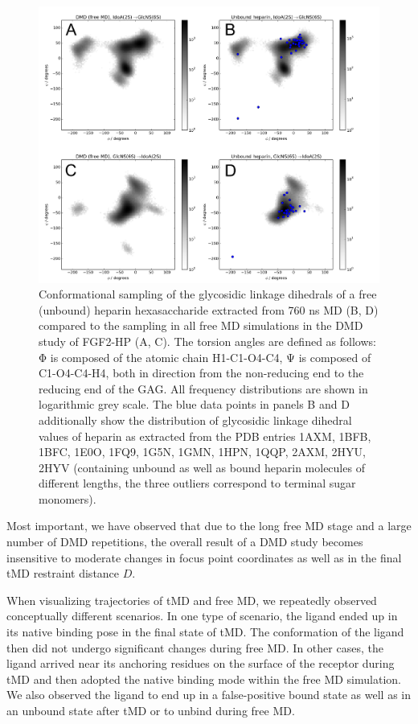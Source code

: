 \begin{figure}
\begin{adjustwidth}{-1.5cm}{-1.5cm}
\centering
\includegraphics[width=1.3\textwidth]{gfx/dmd/suppl/suppl_glyco_linkage_torsion_maps_03.png}
\caption[]{
Conformational sampling of the glycosidic linkage dihedrals of a free (unbound)
heparin hexasaccharide extracted from 760 ns MD (B, D) compared to the sampling
in all free MD simulations in the DMD study of FGF2-HP (A, C). The torsion
angles are defined as follows: Φ is composed of the atomic chain H1-C1-O4-C4, Ψ
is composed of C1-O4-C4-H4, both in direction from the non-reducing end to the
reducing end of the GAG. All frequency distributions are shown in logarithmic
grey scale. The blue data points in panels B and D additionally show the
distribution of glycosidic linkage dihedral values of heparin as extracted from
the PDB entries 1AXM, 1BFB, 1BFC, 1E0O, 1FQ9, 1G5N, 1GMN, 1HPN, 1QQP, 2AXM,
2HYU, 2HYV (containing unbound as well as bound heparin molecules of different
lengths, the three outliers correspond to terminal sugar monomers).
}
\label{fig:dmd:glycolinkage_sampling}
\end{adjustwidth}
\end{figure}


Most important, we have observed that due to the long free MD stage and a large
number of DMD repetitions, the overall result of a DMD study becomes insensitive
to moderate changes in focus point coordinates as well as in the final tMD
restraint distance $D$.

When visualizing trajectories of tMD and free MD, we repeatedly observed
conceptually different scenarios. In one type of scenario, the ligand ended up
in its native binding pose in the final state of tMD. The conformation of the
ligand then did not undergo significant changes during free MD. In other cases,
the ligand arrived near its anchoring residues on the surface of the receptor
during tMD and then adopted the native binding mode within the free MD
simulation. We also observed the ligand to end up in a false-positive bound
state as well as in an unbound state after tMD or to unbind during free MD.

